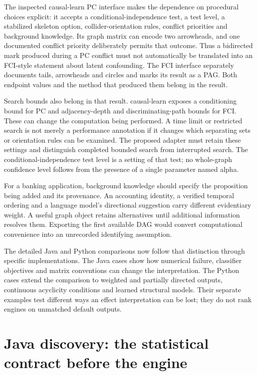 The inspected causal-learn PC interface makes the dependence on procedural
choices explicit: it accepts a conditional-independence test, a test level,
a stabilized skeleton option, collider-orientation rules, conflict priorities
and background knowledge. Its graph matrix can encode two arrowheads, and
one documented conflict priority deliberately permits that outcome. Thus a
bidirected mark produced during a PC conflict must not automatically be
translated into an FCI-style statement about latent confounding. The FCI
interface separately documents tails, arrowheads and circles and marks its
result as a PAG. Both endpoint values and the method that produced them
belong in the result. \citep{v12_sw_causallearn}

Search bounds also belong in that result. causal-learn exposes a conditioning
bound for PC and adjacency-depth and discriminating-path bounds for FCI. These
can change the computation being performed. A time limit or restricted search
is not merely a performance annotation if it changes which separating sets or
orientation rules can be examined. The proposed adapter must retain these
settings and distinguish completed bounded search from interrupted search.
The conditional-independence test level is a setting of that test; no whole-graph
confidence level follows from the presence of a single parameter named alpha.

For a banking application, background knowledge should specify the proposition
being added and its provenance. An accounting identity, a verified temporal
ordering and a language model's directional suggestion carry different
evidentiary weight. A useful graph object retains alternatives until additional
information resolves them. Exporting the first available DAG would convert
computational convenience into an unrecorded identifying assumption.

The detailed Java and Python comparisons now follow that distinction through
specific implementations. The Java cases show how numerical failure,
classifier objectives and matrix conventions can change the interpretation.
The Python cases extend the comparison to weighted and partially directed
outputs, continuous acyclicity conditions and learned structural models.
Their separate examples test different ways an effect interpretation can be
lost; they do not rank engines on unmatched default outputs.



\hypertarget{java-discovery-the-statistical-contract-before-the-engine}{%
\section{Java discovery: the statistical contract before the
engine}\label{java-discovery-the-statistical-contract-before-the-engine}}

